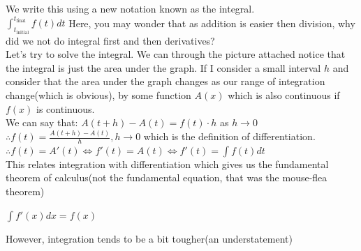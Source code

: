 We write this using a new notation known as the integral.\\
$\int^{t_{\text{final}}}_{t_{\text{initial}}} f(t) dt$
Here, you may wonder that as addition is easier then division, why did we not do integral first and then derivatives?\\
Let's try to solve the integral. We can through the picture attached notice that the integral is just the area under the graph. If I consider a small interval $h$ and consider that the area under the graph changes as our range of integration change(which is obvious), by some function $A(x)$ which is also continuous if $f(x)$ is continuous.\\
We can say that:
$A(t+h)-A(t)=f(t) \cdot h$ as $h \to 0$\\
$\therefore f(t)=\frac{A(t+h)-A(t)}{h}, h \to 0$ which is the definition of differentiation.\\
$\therefore f(t)=A'(t) \iff f'(t)=A(t) \iff f'(t)=\int f(t)dt$\\
This relates integration with differentiation which gives us the fundamental theorem of calculus(not the fundamental equation, that was the mouse-flea theorem)\\
\begin{theorem}
    $\int f'(x) dx = f(x)$
\end{theorem}
However, integration tends to be a bit tougher(an understatement)\\

